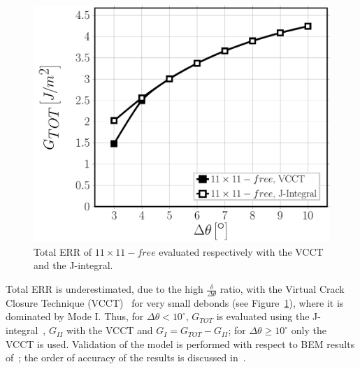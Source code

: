 \begin{figure}[!h]
\centering
        \includegraphics[height=0.2\textheight]{vf60-G-methodsaccuracy.pdf}
\caption{Total ERR of $11\times11-free$ evaluated respectively with the VCCT and the J-integral.}\label{paperE:fig:errerror}
\end{figure}

Total ERR is underestimated, due to the high $\frac{\delta}{\Delta\theta}$ ratio, with the Virtual Crack Closure Technique (VCCT)~\cite{Krueger2004} for very small debonds (see Figure~\ref{paperE:fig:errerror}), where it is dominated by Mode I. Thus, for $\Delta\theta<10^{\circ}$, $G_{TOT}$ is evaluated using the J-integral~\cite{Rice1968}, $G_{II}$ with the VCCT and $G_{I}=G_{TOT}-G_{II}$; for $\Delta\theta\geq10^{\circ}$ only the VCCT is used. Validation of the model is performed with respect to BEM results of~\cite{Paris2007,Sandino2016}; the order of accuracy of the results is discussed in~\cite{DiStasio2019}.

